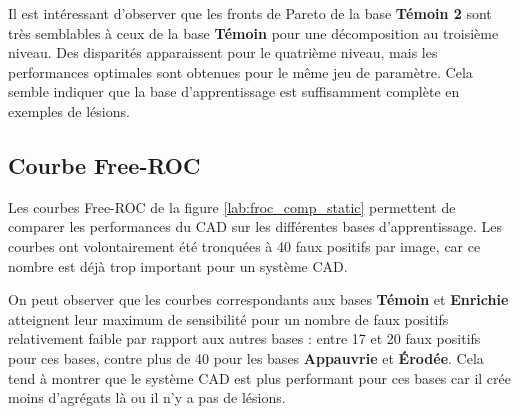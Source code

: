 Il est intéressant d'observer que les fronts de Pareto de la base \textbf{Témoin 2} sont très semblables à ceux de la base \textbf{Témoin} pour une décomposition au troisième niveau. Des disparités apparaissent pour le quatrième niveau, mais les performances optimales sont obtenues pour le même jeu de paramètre. Cela semble indiquer que la base d’apprentissage est suffisamment complète en exemples de lésions.
\begin{table}[h!]
\centering
{}
\caption[Paramètres $(C,\gamma, j)$ sélectionnés pour l'optimisation des performances sur les différentes bases]{Paramètres $(C,\gamma, j)$ sélectionnés pour l'optimisation des performances sur les différentes bases. Sont indiqués pour chaque base le triplet de paramètres sélectionnés ainsi que sa position sur le front de Pareto.}
\label{fig:paramsParams}
\end{table}

\FloatBarrier

\subsection{Courbe Free-ROC}

Les courbes Free-ROC de la figure \ref{lab:froc_comp_static} permettent de comparer les performances du CAD sur les différentes bases d'apprentissage. Les courbes ont volontairement été tronquées à 40 faux positifs par image, car ce nombre est déjà trop important pour un système CAD.

On peut observer que les courbes correspondants aux bases \textbf{Témoin} et \textbf{Enrichie} atteignent leur maximum de sensibilité pour un nombre de faux positifs relativement faible par rapport aux autres bases : entre 17 et 20 faux positifs pour ces bases, contre plus de 40 pour les bases \textbf{Appauvrie} et \textbf{Érodée}. Cela tend à montrer que le système CAD est plus performant pour ces bases car il crée moins d'agrégats là ou il n'y a pas de lésions.

